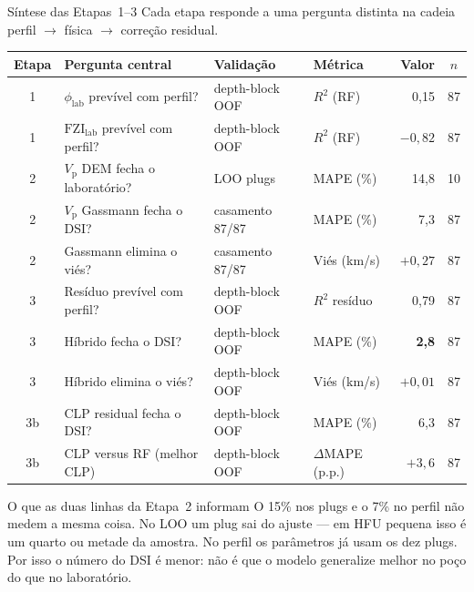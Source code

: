 \documentclass[aspectratio=169,10pt]{beamer}
\newcommand{\philab}{\ensuremath{\phi_{\mathrm{lab}}}}
\newcommand{\fzilab}{\ensuremath{\mathrm{FZI}_{\mathrm{lab}}}}
\newcommand{\Vp}{\ensuremath{V_{\mathrm{p}}}}
\begin{document}
\begin{frame}{Síntese das Etapas~1--3}
  \footnotesize
  Cada etapa responde a uma pergunta distinta na cadeia
  perfil $\rightarrow$ física $\rightarrow$ correção residual.
  \vspace{0.08cm}
  \centering
  \scriptsize
  \setlength{\tabcolsep}{4pt}
  \begin{tabular}{clllrc}
    \toprule
    Etapa & Pergunta central & Validação & Métrica & Valor & $n$ \\
    \midrule
    1 & \philab{} prevível com perfil? & depth-block OOF & $R^2$ (RF) & 0,15 & 87 \\
    1 & \fzilab{} prevível com perfil? & depth-block OOF & $R^2$ (RF) & $-0{,}82$ & 87 \\
    2 & \Vp{} DEM fecha o laboratório? & LOO plugs & MAPE (\%) & 14,8 & 10 \\
    2 & \Vp{} Gassmann fecha o DSI? & casamento 87/87 & MAPE (\%) & 7,3 & 87 \\
    2 & Gassmann elimina o viés? & casamento 87/87 & Viés (km/s) & $+0{,}27$ & 87 \\
    3 & Resíduo prevível com perfil? & depth-block OOF & $R^2$ resíduo & 0,79 & 87 \\
    3 & Híbrido fecha o DSI? & depth-block OOF & MAPE (\%) & \textbf{2,8} & 87 \\
    3 & Híbrido elimina o viés? & depth-block OOF & Viés (km/s) & $+0{,}01$ & 87 \\
    3b & CLP residual fecha o DSI? & depth-block OOF & MAPE (\%) & 6,3 & 87 \\
    3b & CLP versus RF (melhor CLP) & depth-block OOF & $\Delta$MAPE (p.p.) & $+3{,}6$ & 87 \\
    \bottomrule
  \end{tabular}
  \vspace{0.12cm}
  \begin{block}{O que as duas linhas da Etapa~2 informam}
    \scriptsize
    O 15\% nos plugs e o 7\% no perfil não medem a mesma coisa.
    No LOO um plug sai do ajuste --- em HFU pequena isso é um quarto
    ou metade da amostra. No perfil os parâmetros já usam os dez plugs.
    Por isso o número do DSI é menor: não é que o modelo generalize
    melhor no poço do que no laboratório.
  \end{block}
\end{frame}
\end{document}
